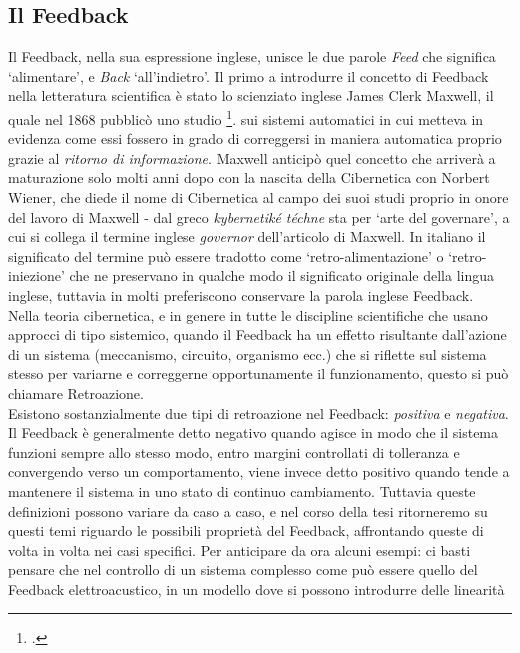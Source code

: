 \subsection{Il Feedback}
\label{sec:Il Feedback}
Il Feedback, nella sua espressione inglese, 
unisce le due parole \textit{Feed} che significa ‘alimentare’, 
e \textit{Back} ‘all’indietro’. 
Il primo a introdurre il concetto di Feedback nella letteratura scientifica 
è stato lo scienziato inglese James Clerk Maxwell, 
il quale nel 1868 pubblicò uno studio \footcite{maxwellongovernor}.
sui sistemi automatici in cui metteva in evidenza come essi fossero in grado di correggersi
in maniera automatica proprio grazie al \textit{ritorno di informazione}.
Maxwell anticipò quel concetto che arriverà a maturazione solo molti anni dopo con 
la nascita della Cibernetica con Norbert Wiener, che diede il nome di Cibernetica al campo dei suoi studi proprio in onore del lavoro di Maxwell - dal greco \textit{kybernetiké téchne} sta per ‘arte del governare’, a cui si collega il termine inglese \textit{governor} dell'articolo di Maxwell.
In italiano il significato del termine può essere tradotto come ‘retro-alimentazione’
o ‘retro-iniezione’ che ne preservano in qualche modo il significato originale della lingua inglese,
tuttavia in molti preferiscono conservare la parola inglese Feedback. \\
Nella teoria cibernetica, e in genere in tutte le discipline scientifiche che usano approcci di tipo sistemico, quando il Feedback ha un effetto risultante dall’azione di un sistema (meccanismo, circuito, organismo ecc.) che si riflette sul sistema stesso per variarne e correggerne opportunamente il funzionamento, questo si può chiamare Retroazione. \\
Esistono sostanzialmente due tipi di retroazione nel Feedback: \textit{positiva} e \textit{negativa}.
Il Feedback è generalmente detto negativo quando agisce in modo che il sistema funzioni sempre allo stesso modo, entro margini controllati di tolleranza e convergendo verso un comportamento, viene invece detto positivo quando tende a mantenere il sistema in uno stato di continuo cambiamento.
Tuttavia queste definizioni possono variare da caso a caso, 
e nel corso della tesi ritorneremo su questi temi
riguardo le possibili proprietà del Feedback, affrontando queste di volta in volta
nei casi specifici.
Per anticipare da ora alcuni esempi: 
ci basti pensare che nel controllo di un sistema complesso
come può essere quello del Feedback elettroacustico,
in un modello dove si possono introdurre delle linearità 
